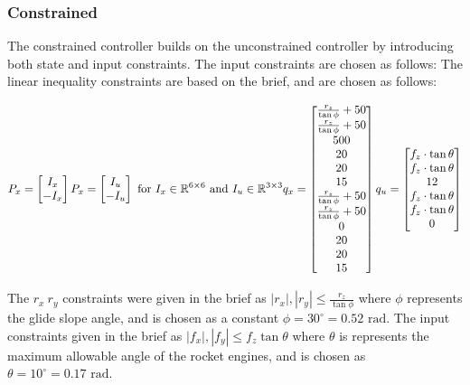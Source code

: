 \documentclass[conference, tikz]{IEEEtran}
\begin{document}
\subsubsection{Constrained}
The constrained controller builds on the unconstrained controller by introducing both state and input constraints. 
The input constraints are chosen as follows:
The linear inequality constraints are based on the brief, and are chosen as follows:
\begin{center}
\[
    P_x = 
    \begin{bmatrix}
        I_x\\
        -I_x
    \end{bmatrix}
    P_x = 
    \begin{bmatrix}
        I_u\\
        -I_u    
    \end{bmatrix}
    \text{ for } I_x \in \mathbb{R}^{6\times 6} \text{ and }I_u\in \mathbb{R}^{3\times 3}
    \\
    q_x = 
    \begin{bmatrix}
        \frac{r_z}{\tan{\phi}}+50\\
        \frac{r_z}{\tan{\phi}}+50\\
        500\\
        20\\
        20\\
        15\\
        \frac{r_z}{\tan{\phi}}+50\\
        \frac{r_z}{\tan{\phi}}+50\\
        0\\
        20\\
        20\\
        15
    \end{bmatrix}
    q_u =
    \begin{bmatrix}
        f_z\cdot\tan{\theta}\\
        f_z\cdot\tan{\theta}\\
        12\\
        f_z\cdot\tan{\theta}\\
        f_z\cdot\tan{\theta}\\
        0
    \end{bmatrix}
\]
\end{center}

The $r_x \ r_y$ constraints were given in the brief as $|r_x|, |r_y| \le \frac{r_z}{\tan{\phi}}$ where $\phi$ represents the glide slope angle, and is chosen as a constant $\phi = 30^\circ = 0.52\text{ rad}$.
The input constraints given in the brief as $|f_x|, |f_y| \le f_z \tan{\theta}$ where $\theta$ is represents the maximum allowable angle of the rocket engines, and is chosen as $\theta = 10 ^\circ = 0.17\text{ rad}$.
\end{document}
